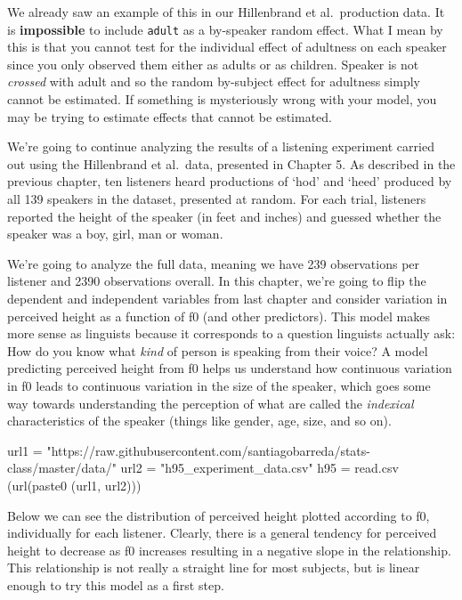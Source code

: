 \documentclass[
]{book}
\newenvironment{Shaded}{\begin{snugshade}}{\end{snugshade}}
\newcommand{\FunctionTok}[1]{\textcolor[rgb]{0.00,0.00,0.00}{#1}}
\newcommand{\NormalTok}[1]{#1}
\newcommand{\OtherTok}[1]{\textcolor[rgb]{0.56,0.35,0.01}{#1}}
\newcommand{\StringTok}[1]{\textcolor[rgb]{0.31,0.60,0.02}{#1}}
\begin{document}
We already saw an example of this in our Hillenbrand et al.~production data. It is \textbf{impossible} to include \texttt{adult} as a by-speaker random effect. What I mean by this is that you cannot test for the individual effect of adultness on each speaker since you only observed them either as adults or as children. Speaker is not \emph{crossed} with adult and so the random by-subject effect for adultness simply cannot be estimated. If something is mysteriously wrong with your model, you may be trying to estimate effects that cannot be estimated.

We're going to continue analyzing the results of a listening experiment carried out using the Hillenbrand et al.~data, presented in Chapter 5. As described in the previous chapter, ten listeners heard productions of `hod' and `heed' produced by all 139 speakers in the dataset, presented at random. For each trial, listeners reported the height of the speaker (in feet and inches) and guessed whether the speaker was a boy, girl, man or woman.

We're going to analyze the full data, meaning we have 239 observations per listener and 2390 observations overall. In this chapter, we're going to flip the dependent and independent variables from last chapter and consider variation in perceived height as a function of f0 (and other predictors). This model makes more sense as linguists because it corresponds to a question linguists actually ask: How do you know what \emph{kind} of person is speaking from their voice? A model predicting perceived height from f0 helps us understand how continuous variation in f0 leads to continuous variation in the size of the speaker, which goes some way towards understanding the perception of what are called the \emph{indexical} characteristics of the speaker (things like gender, age, size, and so on).

\begin{Shaded}
\begin{Highlighting}[]
\NormalTok{url1 }\OtherTok{=} \StringTok{"https://raw.githubusercontent.com/santiagobarreda/stats{-}class/master/data/"}
\NormalTok{url2 }\OtherTok{=} \StringTok{"h95\_experiment\_data.csv"}
\NormalTok{h95 }\OtherTok{=} \FunctionTok{read.csv}\NormalTok{ (}\FunctionTok{url}\NormalTok{(}\FunctionTok{paste0}\NormalTok{ (url1, url2)))}
\end{Highlighting}
\end{Shaded}

Below we can see the distribution of perceived height plotted according to f0, individually for each listener. Clearly, there is a general tendency for perceived height to decrease as f0 increases resulting in a negative slope in the relationship. This relationship is not really a straight line for most subjects, but is linear enough to try this model as a first step.
\end{document}
